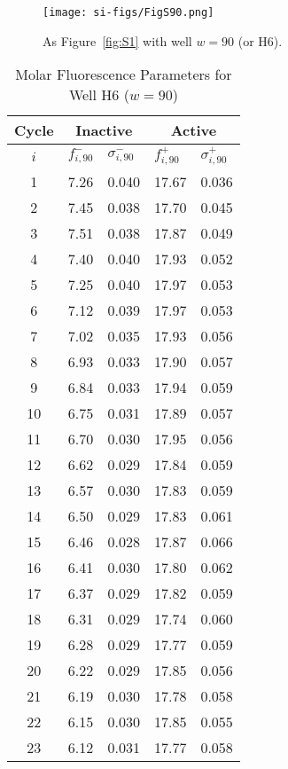                 \begin{figure}
                    \centering
                    \texttt{[image: si-figs/FigS90.png]}
                    \caption{
                        As Figure~\ref{fig:S1} with well $w=90$ (or H6).
                    }
                \end{figure}
                \clearpage
    \begin{table}
        \caption{Molar Fluorescence Parameters for Well H6 ($w=90$)}
        \centering
        \begin{tabular}{c|ll|ll}
            Cycle & \multicolumn{2}{c|}{Inactive} & \multicolumn{2}{c}{Active} \\
            \hline
            $i$ & $f_{i,90}^{-}$ & $\sigma_{i,90}^{-}$ &  $f_{i,90}^{+}$ & $\sigma_{i,90}^{+}$ \\
            \hline
    1 & 7.26 & 0.040 & 17.67 & 0.036 \\
2 & 7.45 & 0.038 & 17.70 & 0.045 \\
3 & 7.51 & 0.038 & 17.87 & 0.049 \\
4 & 7.40 & 0.040 & 17.93 & 0.052 \\
5 & 7.25 & 0.040 & 17.97 & 0.053 \\
6 & 7.12 & 0.039 & 17.97 & 0.053 \\
7 & 7.02 & 0.035 & 17.93 & 0.056 \\
8 & 6.93 & 0.033 & 17.90 & 0.057 \\
9 & 6.84 & 0.033 & 17.94 & 0.059 \\
10 & 6.75 & 0.031 & 17.89 & 0.057 \\
11 & 6.70 & 0.030 & 17.95 & 0.056 \\
12 & 6.62 & 0.029 & 17.84 & 0.059 \\
13 & 6.57 & 0.030 & 17.83 & 0.059 \\
14 & 6.50 & 0.029 & 17.83 & 0.061 \\
15 & 6.46 & 0.028 & 17.87 & 0.066 \\
16 & 6.41 & 0.030 & 17.80 & 0.062 \\
17 & 6.37 & 0.029 & 17.82 & 0.059 \\
18 & 6.31 & 0.029 & 17.74 & 0.060 \\
19 & 6.28 & 0.029 & 17.77 & 0.059 \\
20 & 6.22 & 0.029 & 17.85 & 0.056 \\
21 & 6.19 & 0.030 & 17.78 & 0.058 \\
22 & 6.15 & 0.030 & 17.85 & 0.055 \\
23 & 6.12 & 0.031 & 17.77 & 0.058 \\

\end{tabular}
\end{table}
